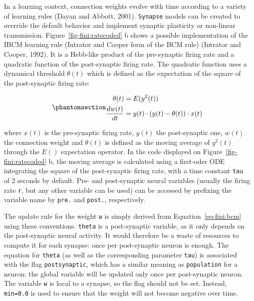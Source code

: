 \documentclass[
  11pt,
  a4paper,
]{scrbook}
\begin{document}
In a learning context, connection weights evolve with time according to
a variety of learning rules (Dayan and Abbott, 2001). \texttt{Synapse}
models can be created to override the default behavior and implement
synaptic plasticity or non-linear transmission.
Figure~\ref{fig-fini:ratecoded} b shows a possible implementation of the
IBCM learning rule (Intrator and Cooper form of the BCM rule) (Intrator
and Cooper, 1992). It is a Hebb-like product of the pre-synaptic firing
rate and a quadratic function of the post-synaptic firing rate. The
quadratic function uses a dynamical threshold \(\theta(t)\) which is
defined as the expectation of the square of the post-synaptic firing
rate:

\begin{equation}\phantomsection\label{eq-fini:bcm}{
  \begin{aligned}
    \theta(t) &= E(y^2(t)) \\
    \frac{d w(t)}{dt} &= y(t) \cdot (y(t) - \theta(t)) \cdot x(t)
  \end{aligned}
}\end{equation}

where \(x(t)\) is the pre-synaptic firing rate, \(y(t)\) the
post-synaptic one, \(w(t)\) the connection weight and \(\theta(t)\) is
defined as the moving average of \(y^2(t)\) through the \(E()\)
expectation operator. In the code displayed on
Figure~\ref{fig-fini:ratecoded} b, the moving average is calculated
using a first-oder ODE integrating the square of the post-synaptic
firing rate, with a time constant \texttt{tau} of 2 seconds by default.
Pre- and post-synaptic neural variables (usually the firing rate
\texttt{r}, but any other variable can be used) can be accessed by
prefixing the variable name by \texttt{pre.} and \texttt{post.},
respectively.

The update rule for the weight \texttt{w} is simply derived from
Equation~\ref{eq-fini:bcm} using these conventions. \texttt{theta} is a
post-synaptic variable, as it only depends on the post-synaptic neural
activity. It would therefore be a waste of resources to compute it for
each synapse: once per post-synaptic neuron is enough. The equation for
\texttt{theta} (as well as the corresponding parameter \texttt{tau}) is
associated with the flag \texttt{postsynaptic}, which has a similar
meaning as \texttt{population} for a neuron: the global variable will be
updated only once per post-synaptic neuron. The variable \texttt{w} is
local to a synapse, so the flag should not be set. Instead,
\texttt{min=0.0} is used to ensure that the weight will not become
negative over time.
\end{document}

